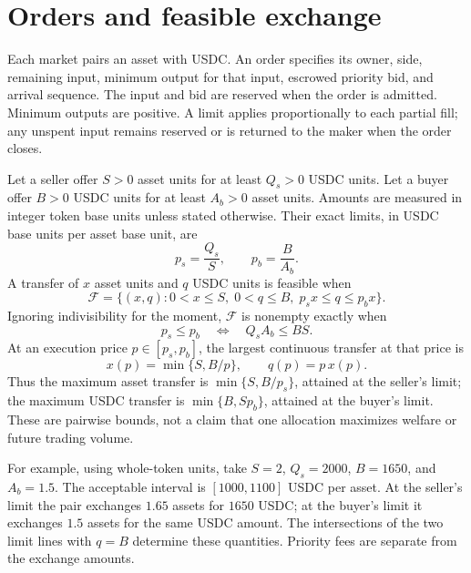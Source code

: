 \documentclass{article}
\begin{document}
\section{Orders and feasible exchange}

Each market pairs an asset with USDC. An order specifies its owner, side, remaining input,
minimum output for that input, escrowed priority bid, and arrival sequence. The input and bid
are reserved when the order is admitted. Minimum outputs are positive. A limit applies
proportionally to each partial fill; any unspent input remains reserved or is returned to
the maker when the order closes.

Let a seller offer $S>0$ asset units for at least $Q_s>0$ USDC units. Let a buyer offer
$B>0$ USDC units for at least $A_b>0$ asset units. Amounts are measured in integer token
base units unless stated otherwise. Their exact limits, in USDC base units per asset base
unit, are
\begin{equation}
 p_s=\frac{Q_s}{S},\qquad p_b=\frac{B}{A_b}.
\end{equation}
A transfer of $x$ asset units and $q$ USDC units is feasible when
\begin{equation}
 \mathcal F=\{(x,q):0<x\le S,\;0<q\le B,\;p_sx\le q\le p_bx\}.
 \label{eq:feasible}
\end{equation}
Ignoring indivisibility for the moment, $\mathcal F$ is nonempty exactly when
\begin{equation}
 p_s\le p_b\quad\Longleftrightarrow\quad Q_sA_b\le BS.
 \label{eq:cross}
\end{equation}
At an execution price $p\in[p_s,p_b]$, the largest continuous transfer at that price is
\begin{equation}
 x(p)=\min\{S,B/p\},\qquad q(p)=p\,x(p).
 \label{eq:frontier}
\end{equation}
Thus the maximum asset transfer is $\min\{S,B/p_s\}$, attained at the seller's limit;
the maximum USDC transfer is $\min\{B,Sp_b\}$, attained at the buyer's limit. These are
pairwise bounds, not a claim that one allocation maximizes welfare or future trading volume.

For example, using whole-token units, take $S=2$, $Q_s=2000$, $B=1650$, and $A_b=1.5$.
The acceptable interval is $[1000,1100]$ USDC per asset. At the seller's limit the pair
exchanges $1.65$ assets for $1650$ USDC; at the buyer's limit it exchanges $1.5$ assets for
the same USDC amount. The intersections of the two limit lines with $q=B$ determine these
quantities. Priority fees are separate from the exchange amounts.
\end{document}

